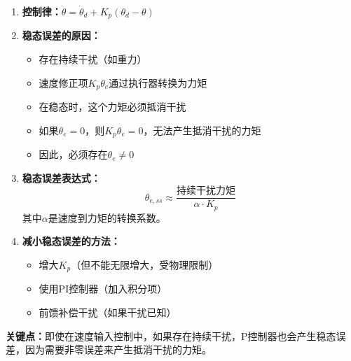 \documentclass[12pt,a4paper]{article}
\begin{document}
\begin{enumerate}
\item \textbf{控制律：}$\dot{\theta} = \dot{\theta}_d + K_p(\theta_d - \theta)$

\item \textbf{稳态误差的原因：}
   \begin{itemize}
   \item 存在持续干扰（如重力）
   \item 速度修正项$K_p \theta_e$通过执行器转换为力矩
   \item 在稳态时，这个力矩必须抵消干扰
   \item 如果$\theta_e = 0$，则$K_p \theta_e = 0$，无法产生抵消干扰的力矩
   \item 因此，必须存在$\theta_e \neq 0$
   \end{itemize}

\item \textbf{稳态误差表达式：}
   \begin{equation}
   \theta_{e,ss} \approx \frac{\text{持续干扰力矩}}{\alpha \cdot K_p}
   \end{equation}
   其中$\alpha$是速度到力矩的转换系数。

\item \textbf{减小稳态误差的方法：}
   \begin{itemize}
   \item 增大$K_p$（但不能无限增大，受物理限制）
   \item 使用PI控制器（加入积分项）
   \item 前馈补偿干扰（如果干扰已知）
   \end{itemize}
\end{enumerate}

\textbf{关键点：}即使在速度输入控制中，如果存在持续干扰，P控制器也会产生稳态误差，因为需要非零误差来产生抵消干扰的力矩。
\end{document}
